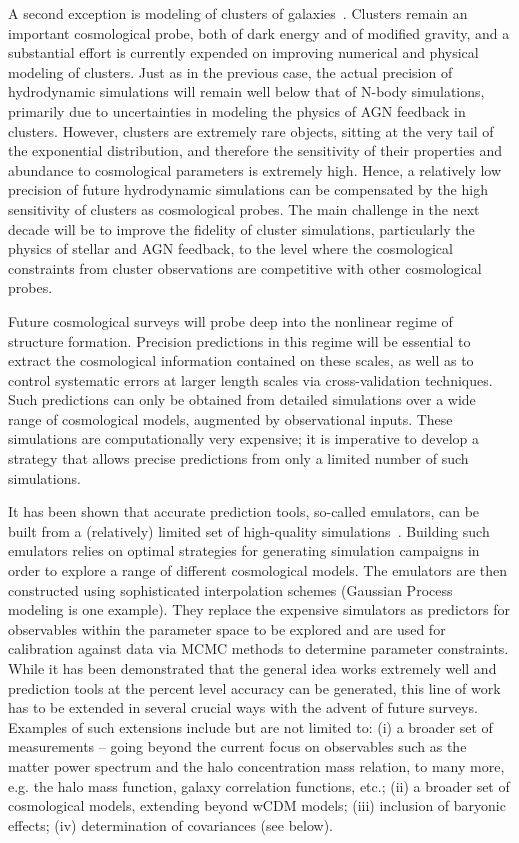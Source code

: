 A second exception is modeling of clusters of
galaxies~\cite{clusters}. Clusters remain an important cosmological
probe, both of dark energy and of modified gravity, and a substantial
effort is currently expended on improving numerical and physical
modeling of clusters. Just as in the previous case, the actual
precision of hydrodynamic simulations will remain well below that of
N-body simulations, primarily due to uncertainties in modeling the
physics of AGN feedback in clusters.  However, clusters are extremely
rare objects, sitting at the very tail of the exponential
distribution, and therefore the sensitivity of their properties and
abundance to cosmological parameters is extremely high. Hence, a
relatively low precision of future hydrodynamic simulations can be
compensated by the high sensitivity of clusters as cosmological
probes. The main challenge in the next decade will be to improve the
fidelity of cluster simulations, particularly the physics of stellar
and AGN feedback, to the level where the cosmological constraints from
cluster observations are competitive with other cosmological probes.

\medskip


Future cosmological surveys will probe deep into the nonlinear regime
of structure formation. Precision predictions in this regime will be
essential to extract the cosmological information contained on these
scales, as well as to control systematic errors at larger length
scales via cross-validation techniques. Such predictions can only be
obtained from detailed simulations over a wide range of cosmological
models, augmented by observational inputs. These simulations are
computationally very expensive; it is imperative to develop a strategy
that allows precise predictions from only a limited number of such
simulations.

It has been shown that accurate prediction tools, so-called emulators,
can be built from a (relatively) limited set of high-quality
simulations~\cite{emu}. Building such emulators relies on optimal
strategies for generating simulation campaigns in order to explore a
range of different cosmological models. The emulators are then
constructed using sophisticated interpolation schemes (Gaussian
Process modeling is one example). They replace the expensive
simulators as predictors for observables within the parameter space to
be explored and are used for calibration against data via MCMC methods
to determine parameter constraints. While it has been demonstrated
that the general idea works extremely well and prediction tools at the
percent level accuracy can be generated, this line of work has to be
extended in several crucial ways with the advent of future
surveys. Examples of such extensions include but are not limited to:
(i) a broader set of measurements -- going beyond the current focus on
observables such as the matter power spectrum and the halo
concentration mass relation, to many more, e.g. the halo mass
function, galaxy correlation functions, etc.; (ii) a broader set of
cosmological models, extending beyond wCDM models; (iii) inclusion of
baryonic effects; (iv) determination of covariances (see below).

